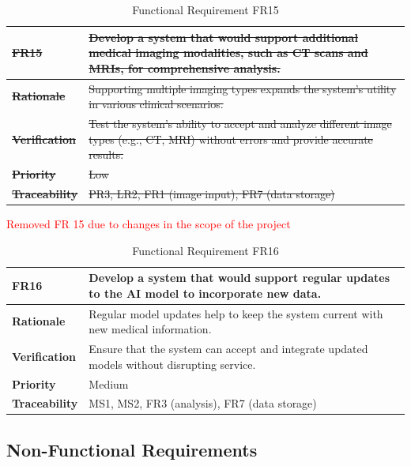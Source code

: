 \documentclass[12pt]{article}
\begin{document}
\begin{table}[h!]
\centering
{}
\begin{tabular}{|p{3.5cm}|p{11.5cm}|}
\hline
\rowcolor{gray!30}
\sout{\textbf{FR15}} & \sout{Develop a system that would support additional medical imaging modalities, such as CT scans and MRIs, for comprehensive analysis.} \\
\hline
\sout{\textbf{Rationale}} & \sout{Supporting multiple imaging types expands the system's utility in various clinical scenarios.} \\
\hline
\sout{\textbf{Verification}} & \sout{Test the system's ability to accept and analyze different image types (e.g., CT, MRI) without errors and provide accurate results.} \\
\hline
\sout{\textbf{Priority}} & \sout{Low} \\
\hline
\sout{\textbf{Traceability}} & \sout{PR3, LR2, FR1 (image input), FR7 (data storage)} \\
\hline
\end{tabular}
\caption{Functional Requirement FR15}
\textcolor{red}{Removed FR 15 due to changes in the scope of the project}
\end{table}

\begin{table}[h!]
\centering
{}
\begin{tabular}{|p{3.5cm}|p{11.5cm}|}
\hline
\rowcolor{gray!30}
\textbf{FR16} & Develop a system that would support regular updates to the AI model to incorporate new data. \\
\hline
\textbf{Rationale} & Regular model updates help to keep the system current with new medical information. \\
\hline
\textbf{Verification} & Ensure that the system can accept and integrate updated models without disrupting service. \\
\hline
\textbf{Priority} & Medium \\
\hline
\textbf{Traceability} & MS1, MS2, FR3 (analysis), FR7 (data storage) \\
\hline
\end{tabular}
\caption{Functional Requirement FR16}
\end{table}  
\clearpage                                                                                                                                                    

\subsection{Non-Functional Requirements}
\end{document}
